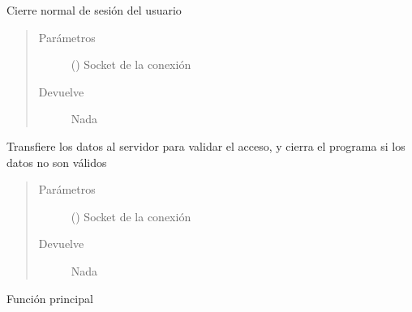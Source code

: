 \documentclass[letterpaper,10pt,spanish,openany,oneside]{sphinxmanual}
\begin{document}
\begin{fulllineitems}
\label{\detokenize{pokemonClient:pokemonClient.cerrarSesion}}
Cierre normal de sesión del usuario
\begin{quote}\begin{description}
\item[{Parámetros}] \leavevmode
{} () \textendash{} Socket de la conexión

\item[{Devuelve}] \leavevmode
Nada

\end{description}\end{quote}

\end{fulllineitems}


\begin{fulllineitems}
\label{\detokenize{pokemonClient:pokemonClient.login}}
Transfiere los datos al servidor para validar el acceso, y cierra el programa si los datos no son válidos
\begin{quote}\begin{description}
\item[{Parámetros}] \leavevmode
{} () \textendash{} Socket de la conexión

\item[{Devuelve}] \leavevmode
Nada

\end{description}\end{quote}

\end{fulllineitems}


\begin{fulllineitems}
\label{\detokenize{pokemonClient:pokemonClient.main}}
Función principal

\end{fulllineitems}
\end{document}
